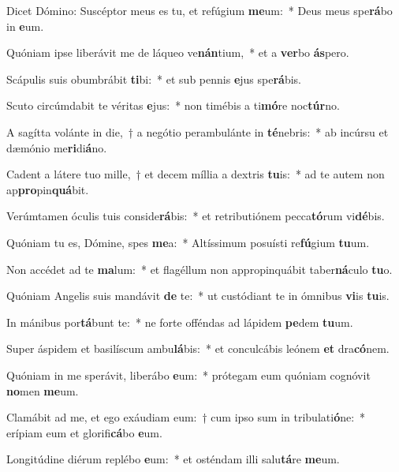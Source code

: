 \item Dicet Dómino: Suscéptor meus es tu, et refúgium \textbf{me}um:~* Deus meus spe\textbf{rá}bo in \textbf{e}um.
\item Quóniam ipse liberávit me de láqueo ve\textbf{nán}tium,~* et a \textbf{ver}bo \textbf{ás}pero.
\item Scápulis suis obumbrábit \textbf{ti}bi:~* et sub pennis \textbf{e}jus spe\textbf{rá}bis.
\item Scuto circúmdabit te véritas \textbf{e}jus:~* non timébis a ti\textbf{mó}re noc\textbf{túr}no.
\item A sagítta volánte in die,~† a negótio perambulánte in \textbf{té}nebris:~* ab incúrsu et dæmónio me\textbf{ri}di\textbf{á}no.
\item Cadent a látere tuo mille,~† et decem míllia a dextris \textbf{tu}is:~* ad te autem non ap\textbf{pro}pin\textbf{quá}bit.
\item Verúmtamen óculis tuis conside\textbf{rá}bis:~* et retributiónem pecca\textbf{tó}rum vi\textbf{dé}bis.
\item Quóniam tu es, Dómine, spes \textbf{me}a:~* Altíssimum posuísti re\textbf{fú}gium \textbf{tu}um.
\item Non accédet ad te \textbf{ma}lum:~* et flagéllum non appropinquábit taber\textbf{ná}culo \textbf{tu}o.
\item Quóniam Angelis suis mandávit \textbf{de} te:~* ut custódiant te in ómnibus \textbf{vi}is \textbf{tu}is.
\item In mánibus por\textbf{tá}bunt te:~* ne forte offéndas ad lápidem \textbf{pe}dem \textbf{tu}um.
\item Super áspidem et basilíscum ambu\textbf{lá}bis:~* et conculcábis leónem \textbf{et} dra\textbf{có}nem.
\item Quóniam in me sperávit, liberábo \textbf{e}um:~* prótegam eum quóniam cognóvit \textbf{no}men \textbf{me}um.
\item Clamábit ad me, et ego exáudiam eum:~† cum ipso sum in tribulati\textbf{ó}ne:~* erípiam eum et glorifi\textbf{cá}bo \textbf{e}um.
\item Longitúdine diérum replébo \textbf{e}um:~* et osténdam illi salu\textbf{tá}re \textbf{me}um.
